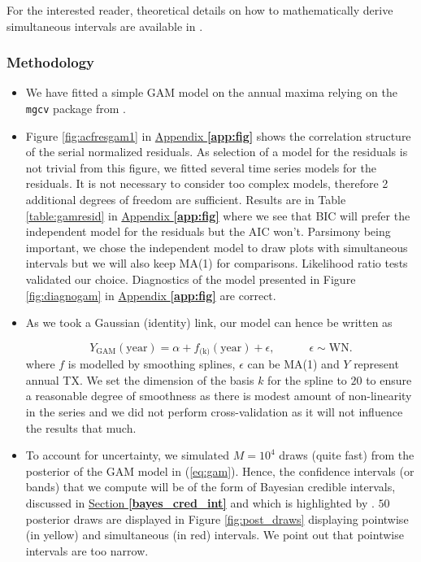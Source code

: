 For the interested reader, theoretical details on how to mathematically derive simultaneous intervals are available in \citet[pp.142-144]{ruppert_semiparametric_2003}.


\subsubsection*{Methodology}

\begin{itemize}
\item We have fitted a simple GAM model on the annual maxima relying on the \texttt{mgcv} package from \citet{maindonald_data_2006}.

\item  Figure \ref{fig:acfresgam1} in \hyperref[app:fig]{Appendix \textbf{\ref{app:fig}}} shows the correlation structure of the serial normalized residuals. As selection of a model for the residuals is not trivial from this figure, we fitted several time series models for the residuals. It is not necessary to consider too complex models, therefore 2 additional degrees of freedom are sufficient. Results are in Table \ref{table:gamresid} in \hyperref[app:fig]{Appendix \textbf{\ref{app:fig}}} where we see that BIC will prefer the independent model for the residuals but the AIC won't. Parsimony being important, we chose the independent model to draw plots with simultaneous intervals but we will also keep MA(1) for comparisons. Likelihood ratio tests validated our choice. Diagnostics of the model presented in Figure \ref{fig:diagnogam} in \hyperref[app:fig]{Appendix \textbf{\ref{app:fig}}} are correct.

\item As we took a Gaussian (identity) link, our model can hence be written as

\begin{equation}\label{eq:gam}
Y_{\text{GAM}}(\text{year}) = \alpha + f_{\text{(k)}}(\text{year})+\epsilon , \qquad\quad \epsilon\sim\text{WN}.
\end{equation}
where $f$ is modelled by smoothing splines, $\epsilon$ can be MA(1) and $Y$ represent annual TX. We set the dimension of the basis $k$ for the spline to $20$ to ensure a reasonable degree of smoothness as there is modest amount of non-linearity in the series and we did not perform cross-validation as it will not influence the results that much. 

\item  To account for uncertainty, we simulated $M = 10^4$ draws (quite fast) from the posterior of the GAM model in (\ref{eq:gam}). Hence, the confidence intervals (or bands) that we compute will be of the form of Bayesian credible intervals,  discussed in \hyperref[bayes_cred_int]{Section \textbf{\ref{bayes_cred_int}}} and which is highlighted by \citet{marra_coverage_2012}.
$50$ posterior draws are displayed in Figure \ref{fig:post_draws} %
 displaying pointwise (in yellow) and simultaneous (in red) intervals. We point out that pointwise intervals are too narrow.
\end{itemize}

